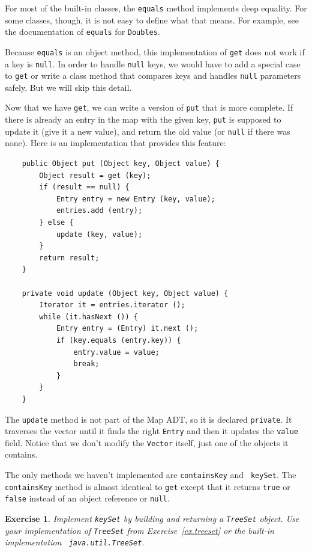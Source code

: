 \documentclass[12pt]{book}
\theoremstyle{exercise}
\newtheorem{exercise}{Exercise}[chapter]
\begin{document}

For most of the built-in classes, the {\tt equals} method
implements deep equality.  For some classes, though, it is
not easy to define what that means.  For example, see the
documentation of {\tt equals} for {\tt Doubles}.


Because {\tt equals} is an object method, this implementation
of {\tt get} does not work if a key is {\tt null}.  In order to
handle {\tt null} keys, we would have to add a special case to
{\tt get} or write a class method that compares keys and handles
{\tt null} parameters safely.  But we will skip this detail.

Now that we have {\tt get}, we can write a version of {\tt put} that
is more complete.  If there is already an entry in the map with the
given key, {\tt put} is supposed to update it (give it a new value),
and return the old value (or {\tt null} if there was none).  Here is
an implementation that provides this feature:

\begin{verbatim}
    public Object put (Object key, Object value) {
        Object result = get (key);
        if (result == null) {
            Entry entry = new Entry (key, value);
            entries.add (entry);
        } else {
            update (key, value);
        }
        return result;
    }

    private void update (Object key, Object value) {
        Iterator it = entries.iterator ();
        while (it.hasNext ()) {
            Entry entry = (Entry) it.next ();
            if (key.equals (entry.key)) {
                entry.value = value;
                break;
            }
        }
    }
\end{verbatim}

The {\tt update} method is not part of the Map ADT, so
it is declared {\tt private}.  It traverses the vector until
it finds the right {\tt Entry} and then it updates
the {\tt value} field.  Notice that we don't modify
the {\tt Vector} itself, just one of the objects it contains.

The only methods we haven't implemented are {\tt containsKey} and {\tt
keySet}.  The {\tt containsKey} method is almost identical to {\tt get}
except that it returns {\tt true} or {\tt false} instead of an object
reference or {\tt null}.

\begin{exercise}
Implement {\tt keySet} by building and returning a {\tt TreeSet}
object.  Use your implementation of {\tt TreeSet} from
Exercise~\ref{ex.treeset} or the built-in implementation {\tt
java.util.TreeSet}.
\end{exercise}
\end{document}
